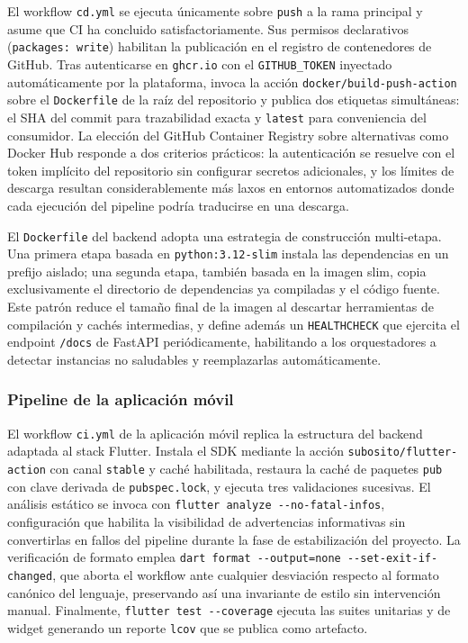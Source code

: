 El workflow \texttt{cd.yml} se ejecuta únicamente sobre
\texttt{push} a la rama principal y asume que CI ha concluido
satisfactoriamente. Sus permisos declarativos
(\texttt{packages: write}) habilitan la publicación en el registro
de contenedores de GitHub. Tras autenticarse en \texttt{ghcr.io}
con el \texttt{GITHUB\_TOKEN} inyectado automáticamente por la
plataforma, invoca la acción \texttt{docker/build-push-action}
sobre el \texttt{Dockerfile} de la raíz del repositorio y publica
dos etiquetas simultáneas: el SHA del commit para trazabilidad
exacta y \texttt{latest} para conveniencia del consumidor. La
elección del GitHub Container Registry sobre alternativas como
Docker Hub responde a dos criterios prácticos: la autenticación se
resuelve con el token implícito del repositorio sin configurar
secretos adicionales, y los límites de descarga resultan
considerablemente más laxos en entornos automatizados donde cada
ejecución del pipeline podría traducirse en una descarga.

El \texttt{Dockerfile} del backend adopta una estrategia de
construcción multi-etapa. Una primera etapa basada en
\texttt{python:3.12-slim} instala las dependencias en un prefijo
aislado; una segunda etapa, también basada en la imagen slim, copia
exclusivamente el directorio de dependencias ya compiladas y el
código fuente. Este patrón reduce el tamaño final de la imagen al
descartar herramientas de compilación y cachés intermedias, y
define además un \texttt{HEALTHCHECK} que ejercita el endpoint
\texttt{/docs} de FastAPI periódicamente, habilitando a los
orquestadores a detectar instancias no saludables y reemplazarlas
automáticamente.

\subsubsection{Pipeline de la aplicación móvil}

El workflow \texttt{ci.yml} de la aplicación móvil replica la
estructura del backend adaptada al stack Flutter. Instala el SDK
mediante la acción \texttt{subosito/flutter-action} con canal
\texttt{stable} y caché habilitada, restaura la caché de paquetes
\texttt{pub} con clave derivada de \texttt{pubspec.lock}, y ejecuta
tres validaciones sucesivas. El análisis estático se invoca con
\texttt{flutter analyze -{}-no-fatal-infos}, configuración que
habilita la visibilidad de advertencias informativas sin
convertirlas en fallos del pipeline durante la fase de
estabilización del proyecto. La verificación de formato emplea
\texttt{dart format -{}-output=none -{}-set-exit-if-changed}, que
aborta el workflow ante cualquier desviación respecto al formato
canónico del lenguaje, preservando así una invariante de estilo
sin intervención manual. Finalmente, \texttt{flutter test
-{}-coverage} ejecuta las suites unitarias y de widget generando un
reporte \texttt{lcov} que se publica como artefacto.

